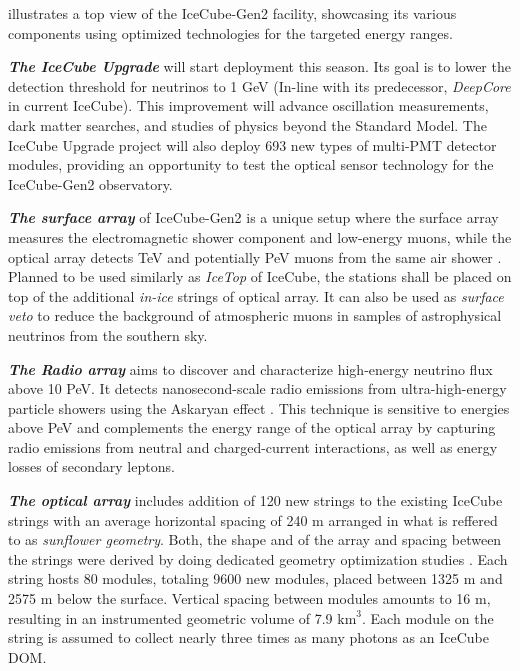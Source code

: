  illustrates a top view of the IceCube-Gen2 facility, showcasing its various components using optimized technologies for the targeted energy ranges. 

\begin{description}
    \item \textbf{\emph{The IceCube Upgrade}} will start deployment this season. Its goal is to lower the detection threshold for neutrinos to 1 GeV (In-line with its predecessor, \emph{DeepCore} in current IceCube). This improvement will advance oscillation measurements, dark matter searches, and studies of physics beyond the Standard Model. The IceCube Upgrade project will also deploy 693 new types of multi-PMT detector modules, providing an opportunity to test the optical sensor technology for the IceCube-Gen2 observatory.

    \item \textbf{\emph{The surface array}} of IceCube-Gen2 is a unique setup where the surface array measures the electromagnetic shower component and low-energy muons, while the optical array detects TeV and potentially PeV muons from the same air shower . Planned to be used similarly as \emph{IceTop} of IceCube, the stations shall be placed on top of the additional \emph{in-ice} strings of optical array. It can also be used as \emph{surface veto} to reduce the background of atmospheric muons in samples of astrophysical neutrinos from the southern sky.

    \item \textbf{\emph{The Radio array}} aims to discover and characterize high-energy neutrino flux above 10 PeV. It detects nanosecond-scale radio emissions from ultra-high-energy particle showers using the Askaryan effect . This technique is sensitive to energies above PeV and complements the energy range of the optical array by capturing radio emissions from neutral and charged-current interactions, as well as energy losses of secondary leptons. 

    \item \textbf{\emph{The optical array}} includes addition of 120 new strings to the existing IceCube strings with an average horizontal spacing of 240 m arranged in what is reffered to as \emph{sunflower geometry}. Both, the shape and of the array and spacing between the strings were derived by doing dedicated geometry optimization studies . Each string hosts 80 modules, totaling 9600 new modules, placed between 1325 m and 2575 m below the surface. Vertical spacing between modules amounts to 16 m, resulting in an instrumented geometric volume of 7.9 $\mathrm{km}^3$. Each module on the string is assumed to collect nearly three times as many photons as an IceCube DOM. 
\end{description}


